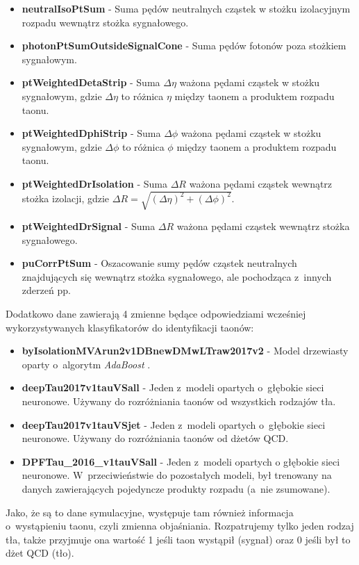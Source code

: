 \documentclass{pracalicmgr}
\begin{document}
\begin{itemize}
	\item \textbf{neutralIsoPtSum} - Suma pędów neutralnych cząstek w stożku izolacyjnym rozpadu wewnątrz stożka sygnałowego.
	\item \textbf{photonPtSumOutsideSignalCone} - Suma pędów fotonów poza stożkiem sygnałowym.
	\item \textbf{ptWeightedDetaStrip} - Suma $\Delta\eta$ ważona pędami cząstek w stożku sygnałowym, gdzie $\Delta\eta$ to różnica $\eta$ między taonem a produktem rozpadu taonu.
	\item \textbf{ptWeightedDphiStrip} - Suma $\Delta\phi$ ważona pędami cząstek w stożku sygnałowym, gdzie $\Delta\phi$ to różnica $\phi$ między taonem a produktem rozpadu taonu.
	\item \textbf{ptWeightedDrIsolation} - Suma $\Delta R$ ważona pędami cząstek wewnątrz stożka izolacji, gdzie $\Delta R = \sqrt{(\Delta\eta)^2 + (\Delta\phi)^2}$.
	\item \textbf{ptWeightedDrSignal} - Suma $\Delta R$ ważona pędami cząstek wewnątrz stożka sygnałowego.
	\item \textbf{puCorrPtSum} - Oszacowanie sumy pędów cząstek neutralnych znajdujących się wewnątrz stożka sygnałowego, ale pochodząca z~innych zderzeń pp.
	\end{itemize}
	
	Dodatkowo dane zawierają 4 zmienne będące odpowiedziami wcześniej wykorzystywanych klasyfikatorów do identyfikacji taonów:
	\begin{itemize}
	\item \textbf{byIsolationMVArun2v1DBnewDMwLTraw2017v2} - Model drzewiasty oparty o~algorytm \textit{AdaBoost} \cite{freund1997decision}.
	\item \textbf{deepTau2017v1tauVSall} - Jeden z~modeli opartych o~głębokie sieci neuronowe. Używany do rozróżniania taonów od wszystkich rodzajów tła.
	\item \textbf{deepTau2017v1tauVSjet} - Jeden z~modeli opartych o~głębokie sieci neuronowe. Używany do rozróżniania taonów od dżetów QCD.
	\item \textbf{DPFTau\_2016\_v1tauVSall} - Jeden z~modeli opartych o głębokie sieci neuronowe. W~przeciwieństwie do pozostałych modeli, był trenowany na danych zawierających pojedyncze produkty rozpadu (a~nie zsumowane).
	\end{itemize}
	
	Jako, że są to dane symulacyjne, występuje tam również informacja o~wystąpieniu taonu, czyli zmienna objaśniania. Rozpatrujemy tylko jeden rodzaj tła, także przyjmuje ona wartość 1 jeśli taon wystąpił (sygnał) oraz 0 jeśli był to dżet QCD (tło).
	
\end{document}
